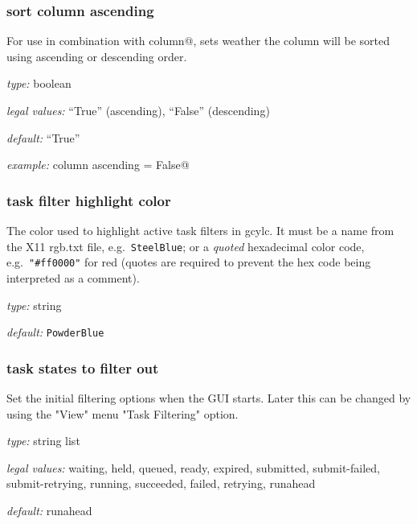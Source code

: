 \subsubsection{sort column ascending}

For use in combination with \lstinline@sort column@, sets weather the column will
be sorted using ascending or descending order.

\begin{myitemize}
    \item {\em type:} boolean
    \item {\em legal values:} ``True'' (ascending), ``False'' (descending)
    \item {\em default:} ``True''
    \item {\em example:} \lstinline@sort column ascending = False@
\end{myitemize}


\subsubsection{task filter highlight color}

The color used to highlight active task filters in gcylc. It must be a name
from the X11 rgb.txt file, e.g.\ \lstinline=SteelBlue=; or a
{\em quoted} hexadecimal color code, e.g.\ \lstinline="#ff0000"= for red (quotes
are required to prevent the hex code being interpreted as a comment).

\begin{myitemize}
    \item {\em type:} string
    \item {\em default:} \lstinline=PowderBlue=
\end{myitemize}


\subsubsection{task states to filter out}

Set the initial filtering options when the GUI starts. Later this can be
changed by using the "View" menu "Task Filtering" option.

\begin{myitemize}
\item {\em type:} string list
\item {\em legal values:} waiting, held, queued, ready, expired, submitted,
submit-failed, submit-retrying, running, succeeded, failed, retrying, runahead
\item {\em default:} runahead
\end{myitemize}


